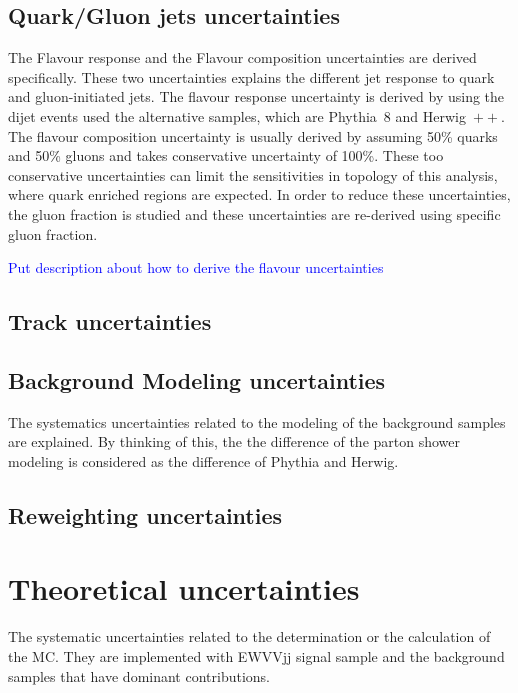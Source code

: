 \subsection{Quark/Gluon jets uncertainties}
The Flavour response and the Flavour composition uncertainties are derived specifically.
These two uncertainties explains the different jet response to quark and gluon-initiated jets. The flavour response uncertainty is derived by using the dijet events used the alternative samples, which are Phythia~8 and Herwig~$\plus\plus$. The flavour composition uncertainty is usually derived by assuming 50\% quarks and 50\% gluons and takes conservative uncertainty of 100\%. These too conservative uncertainties can limit the sensitivities in topology of this analysis, where quark enriched regions are
expected. In order to reduce these uncertainties, the gluon fraction is studied and these uncertainties are re-derived using specific gluon fraction.

\textcolor{blue}{Put description about how to derive the flavour uncertainties}

\subsection{Track uncertainties}


\subsection{Background Modeling uncertainties}
The systematics uncertainties related to the modeling of the background samples are explained.
By thinking of this, the the difference of the parton shower modeling is considered as the difference of Phythia and Herwig.
\subsection{Reweighting uncertainties}

\section{Theoretical uncertainties}
The systematic uncertainties related to the determination or the calculation of the MC.
They are implemented with EWVVjj signal sample and the background samples that have dominant contributions. 


